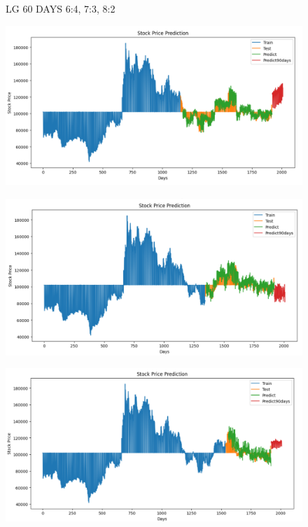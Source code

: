 \documentclass{article}
\begin{document}
\begin{multicols}{2}
\begin{figure}[H]
\begin{minipage}{0.15\textwidth}
    \label{fig:3}
    \end{minipage}
    \caption{LG 60 DAYS  6:4, 7:3, 8:2 }
\end{figure}



\begin{figure}[H]
    \centering
    \begin{minipage}{0.15\textwidth}
    \centering
    \includegraphics[width=1\textwidth]{Image/N_Beat/N_BEAT_6_4_LG_90DAYS.png}
   
    \label{fig:1}
    \end{minipage}%
    \begin{minipage}{0.15\textwidth}
    \centering
    \includegraphics[width=1\textwidth]{Image/N_Beat/N_BEAT_7_3_LG_90DAYS.png}
  
    \label{fig:2}
    \end{minipage}%
    \begin{minipage}{0.15\textwidth}
    \centering
    \includegraphics[width=1\textwidth]{Image/N_Beat/N_BEAT_8_2_LG_90DAYS.png}


\end{minipage}
\end{figure}
\end{multicols}
\end{document}
